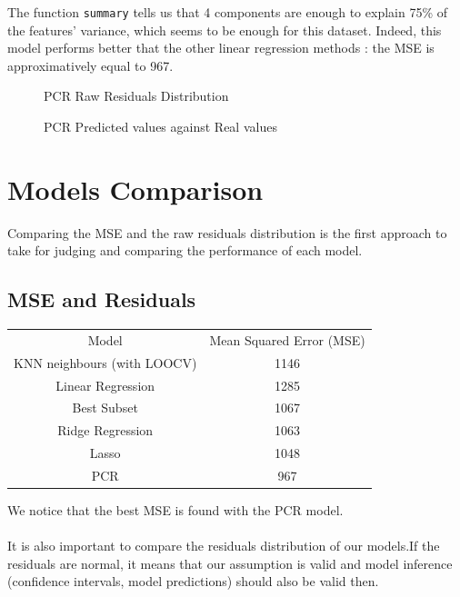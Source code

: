 \documentclass[]{report}
\newcommand{\inputtikz}[2]{%
	\scalebox{#1}{}  
}
\begin{document}
The function \texttt{summary} tells us that 4 components are enough to explain 75\% of the features' variance, which seems to be enough for this dataset. Indeed, this model performs better that the other linear regression methods : the MSE is approximatively equal to 967. 

\begin{figure}[!h]
	\centering
	\inputtikz{0.5}{Figures/pcr_hist.tex}
	\caption{PCR Raw Residuals Distribution}
	\label{fig:pcr_hist}
\end{figure}

\begin{figure}[!h]
	\centering
	\inputtikz{0.5}{Figures/pcr_predicted.tex}
	\caption{PCR Predicted values against Real values}
	\label{fig:pcr_predicted}
\end{figure}


\section{Models Comparison}
Comparing the MSE and the raw residuals distribution is the first approach to take for judging and comparing the performance of each model.\\
\subsection{MSE and Residuals}
\begin{center}
\begin{tabular}{c c}
	Model & Mean Squared Error (MSE) \\
	KNN neighbours (with LOOCV) & 1146\\ 
	Linear Regression & 1285\\
	Best Subset	& 1067\\
	Ridge Regression & 1063 \\	
	Lasso & 1048\\
	PCR & 967 \\
\end{tabular}
\end{center}

We notice that the best MSE is found with the PCR model.
\\\\
It is also important to compare the residuals distribution of our models.If the residuals are normal, it means that our assumption is valid and model inference (confidence intervals, model predictions) should also be valid then.
\end{document}

